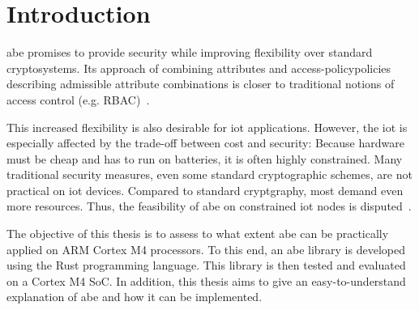 
\chapter{Introduction}\label{chapter:introduction}





\acrfull{abe} promises to provide security while improving flexibility over standard cryptosystems.
Its approach of combining \glspl{attribute} and \gls{access-policy}{policies} describing admissible attribute combinations is closer to traditional notions of access control (e.g. RBAC)~\cite{bethencourt_ciphertext-policy_2007}. %

This increased flexibility is also desirable for \acrshort{iot} applications.
However, the \acrfull{iot} is especially affected by the trade-off between cost and security:
Because hardware must be cheap and has to run on batteries, it is often highly constrained.
Many traditional security measures, even some standard cryptographic schemes, are not practical on \acrshort{iot} devices.
Compared to standard cryptgraphy, most  demand even more resources.
Thus, the feasibility of \acrshort{abe} on constrained \acrshort{iot} nodes is disputed~\cite{wang_performance_2014,ambrosin_feasibility_2016,ambrosin_feasibility_2015,girgenti_feasibility_2019,borgh_attribute-based_2016}.

The objective of this thesis is to assess to what extent \acrshort{abe} can be practically applied on ARM Cortex M4 processors.
To this end, an \acrshort{abe} library is developed using the Rust programming language.
This library is then tested and evaluated on a Cortex M4 SoC.
In addition, this thesis aims to give an easy-to-understand explanation of \acrshort{abe} and how it can be implemented.


